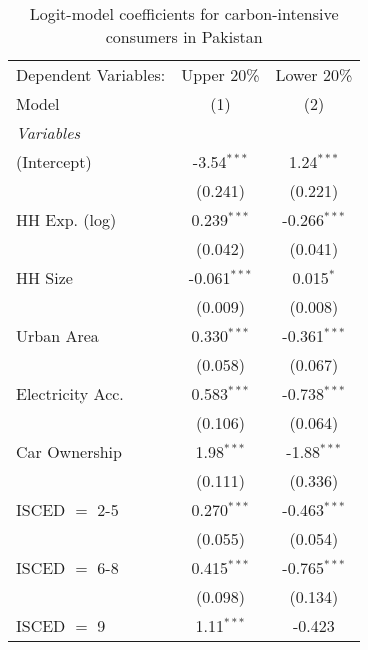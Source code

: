 
\begin{table}[htbp!]
   \centering
   \small
   \begin{adjustbox}{width = 1\textwidth, max height = 0.95\textheight, center}
      \begin{threeparttable}[b]
         \caption{\label{tab:Logit_1_PAK} Logit-model coefficients for carbon-intensive consumers in Pakistan}
         \begin{tabular}{lcc}
            \tabularnewline \midrule \midrule
            Dependent Variables: & Upper 20\%     & Lower 20\%\\   
            Model                & (1)            & (2)\\  
            \midrule
            \emph{Variables}\\
            (Intercept)          & -3.54$^{***}$  & 1.24$^{***}$\\   
                                 & (0.241)        & (0.221)\\   
            HH Exp. (log)        & 0.239$^{***}$  & -0.266$^{***}$\\   
                                 & (0.042)        & (0.041)\\   
            HH Size              & -0.061$^{***}$ & 0.015$^{*}$\\   
                                 & (0.009)        & (0.008)\\   
            Urban Area           & 0.330$^{***}$  & -0.361$^{***}$\\   
                                 & (0.058)        & (0.067)\\   
            Electricity Acc.     & 0.583$^{***}$  & -0.738$^{***}$\\   
                                 & (0.106)        & (0.064)\\   
            Car Ownership        & 1.98$^{***}$   & -1.88$^{***}$\\   
                                 & (0.111)        & (0.336)\\   
            ISCED $=$ 2-5        & 0.270$^{***}$  & -0.463$^{***}$\\   
                                 & (0.055)        & (0.054)\\   
            ISCED $=$ 6-8        & 0.415$^{***}$  & -0.765$^{***}$\\   
                                 & (0.098)        & (0.134)\\   
            ISCED $=$ 9          & 1.11$^{***}$   & -0.423\\   

\end{tabular}
\end{threeparttable}
\end{adjustbox}
\end{table}
